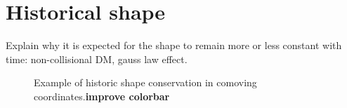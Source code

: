 \section{Historical shape}
Explain why it is expected for the shape to remain more or less constant with time: non-collisional DM, gauss law effect.


\begin{figure}[!ht]
  \centering
  \hfill
  \caption{Example of historic shape conservation in comoving coordinates.\textbf{improve colorbar}}
\end{figure}


